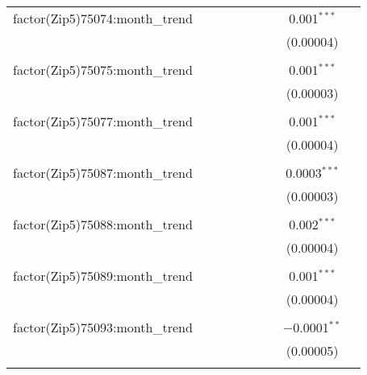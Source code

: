 \begin{table}[H]
{\begin{tabular}{@{\extracolsep{5pt}}lcccccccc}
  factor(Zip5)75074:month\_trend &  &  &  &  &  &  & 0.001$^{***}$ &  \\  

   &  &  &  &  &  &  & (0.00004) &  \\  

   & & & & & & & & \\  

  factor(Zip5)75075:month\_trend &  &  &  &  &  &  & 0.001$^{***}$ &  \\  

   &  &  &  &  &  &  & (0.00003) &  \\  

   & & & & & & & & \\  

  factor(Zip5)75077:month\_trend &  &  &  &  &  &  & 0.001$^{***}$ &  \\  

   &  &  &  &  &  &  & (0.00004) &  \\  

   & & & & & & & & \\  

  factor(Zip5)75087:month\_trend &  &  &  &  &  &  & 0.0003$^{***}$ &  \\  

   &  &  &  &  &  &  & (0.00003) &  \\  

   & & & & & & & & \\  

  factor(Zip5)75088:month\_trend &  &  &  &  &  &  & 0.002$^{***}$ &  \\  

   &  &  &  &  &  &  & (0.00004) &  \\  

   & & & & & & & & \\  

  factor(Zip5)75089:month\_trend &  &  &  &  &  &  & 0.001$^{***}$ &  \\  

   &  &  &  &  &  &  & (0.00004) &  \\  

   & & & & & & & & \\  

  factor(Zip5)75093:month\_trend &  &  &  &  &  &  & $-$0.0001$^{**}$ &  \\  

   &  &  &  &  &  &  & (0.00005) &  \\  

   & & & & & & & & \\  


\end{tabular}}
\end{table}
